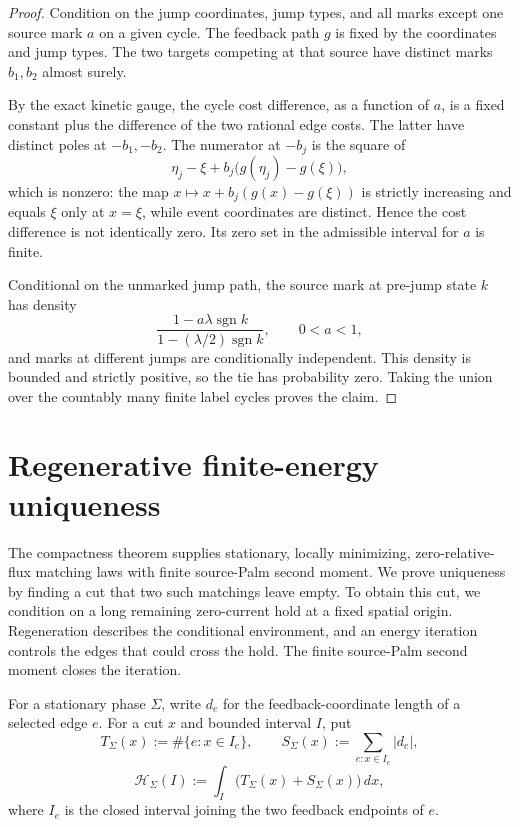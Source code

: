 \documentclass[11pt,reqno]{amsart}
\theoremstyle{definition}
\theoremstyle{remark}
\numberwithin{equation}{section}
\newcommand{\sgn}{\operatorname{sgn}}
\begin{document}
\begin{proof}
Condition on the jump coordinates, jump types, and all marks except
one source mark \(a\) on a given cycle.  The feedback path \(g\)
is fixed by the coordinates and jump types.  The two targets competing
at that source have distinct marks \(b_1,b_2\) almost surely.

By the exact kinetic gauge, the cycle cost difference, as a function
of \(a\), is a fixed constant plus the difference of the two rational
edge costs.  The latter have distinct poles at \(-b_1,-b_2\).
The numerator at \(-b_j\) is the square of
\[
\eta_j-\xi+b_j\bigl(g(\eta_j)-g(\xi)\bigr),
\]
which is nonzero: the map
\(x\mapsto x+b_j(g(x)-g(\xi))\) is strictly increasing and
equals \(\xi\) only at \(x=\xi\), while event coordinates
are distinct.  Hence the cost difference is not identically zero.
Its zero set in the admissible interval for \(a\) is finite.

Conditional on the unmarked jump path, the source mark at pre-jump
state \(k\) has density
\[
\frac{1-a\lambda\sgn k}{1-(\lambda/2)\sgn k},\qquad 0<a<1,
\]
and marks at different jumps are conditionally independent.  This
density is bounded and strictly positive, so the tie has probability zero.
Taking the union over the countably many finite label cycles proves the claim.
\end{proof}

\section{Regenerative finite-energy uniqueness}
\label{sec:regenerative-endgame}

The compactness theorem supplies stationary, locally minimizing,
zero-relative-flux matching laws with finite source-Palm second moment.
We prove uniqueness by finding a cut that two such matchings leave empty.
To obtain this cut, we condition on a long remaining zero-current hold at
a fixed spatial origin.  Regeneration describes the conditional
environment, and an energy iteration controls the edges that could cross
the hold.  The finite source-Palm second moment closes the iteration.

For a stationary phase \(\Sigma\), write \(d_e\) for the feedback-coordinate
length of a selected edge \(e\).  For a cut \(x\) and bounded interval \(I\), put
\begin{equation}
T_\Sigma(x):=\#\{e:x\in I_e\},\qquad
S_\Sigma(x):=\sum_{e:x\in I_e}|d_e|,
\label{eq:8.1}
\end{equation}
\begin{equation}
\mathcal H_\Sigma(I)
:=\int_I\bigl(T_\Sigma(x)+S_\Sigma(x)\bigr)\,dx,
\label{eq:8.2}
\end{equation}
where \(I_e\) is the closed interval joining the two feedback endpoints of \(e\).
\end{document}
